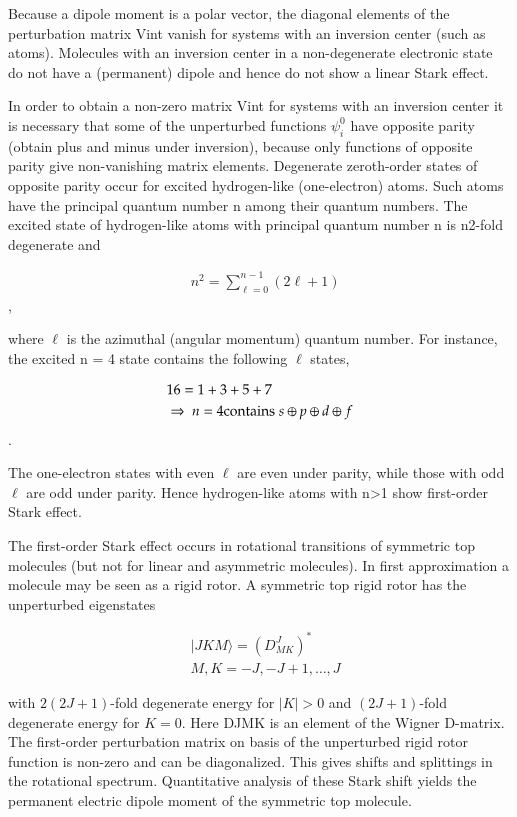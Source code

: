 \documentclass[main.tex]{subfiles}
\begin{document}
Because a dipole moment is a polar vector, the diagonal elements of the perturbation matrix Vint vanish for systems with an inversion center (such as atoms). Molecules with an inversion center in a non-degenerate electronic state do not have a (permanent) dipole and hence do not show a linear Stark effect.

In order to obtain a non-zero matrix Vint for systems with an inversion center it is necessary that some of the unperturbed functions $\psi^0_i$ have opposite parity (obtain plus and minus under inversion), because only functions of opposite parity give non-vanishing matrix elements. Degenerate zeroth-order states of opposite parity occur for excited hydrogen-like (one-electron) atoms. Such atoms have the principal quantum number n among their quantum numbers. The excited state of hydrogen-like atoms with principal quantum number n is n2-fold degenerate and

\begin{align*}
&n^2 = \sum_{\ell=0}^{n-1} (2 \ell + 1)
\end{align*}, 

where $\ell$ is the azimuthal (angular momentum) quantum number. For instance, the excited n = 4 state contains the following $\ell$ states,

\begin{align*}
&16 = 1 + 3 + 5 +7\ \\
&\Rightarrow\  n=4\hbox{contains}\; s\oplus p\oplus d\oplus f
\end{align*}. 

The one-electron states with even $\ell$ are even under parity, while those with odd $\ell$ are odd under parity. Hence hydrogen-like atoms with n>1 show first-order Stark effect.

The first-order Stark effect occurs in rotational transitions of symmetric top molecules (but not for linear and asymmetric molecules). In first approximation a molecule may be seen as a rigid rotor. A symmetric top rigid rotor has the unperturbed eigenstates

\begin{align*}
&|JKM \rangle = (D^J_{MK})^*\\
&M,K= -J,-J+1,\dots,J 
\end{align*}

with $2(2J+1)$-fold degenerate energy for $|K| > 0$ and $(2J+1)$-fold degenerate energy for $K=0$. Here DJMK is an element of the Wigner D-matrix. The first-order perturbation matrix on basis of the unperturbed rigid rotor function is non-zero and can be diagonalized. This gives shifts and splittings in the rotational spectrum. Quantitative analysis of these Stark shift yields the permanent electric dipole moment of the symmetric top molecule.
\end{document}
